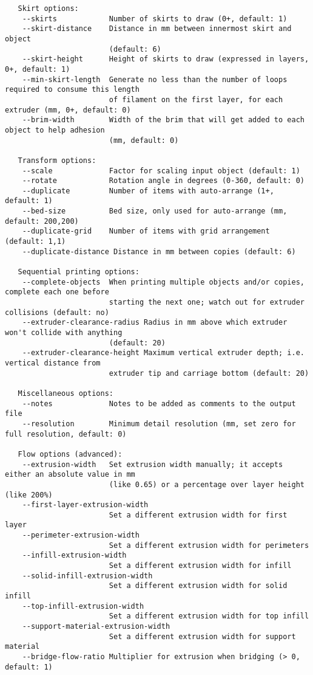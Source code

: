 \begin{verbatim}
   Skirt options:
    --skirts            Number of skirts to draw (0+, default: 1)
    --skirt-distance    Distance in mm between innermost skirt and object
                        (default: 6)
    --skirt-height      Height of skirts to draw (expressed in layers, 0+, default: 1)
    --min-skirt-length  Generate no less than the number of loops required to consume this length
                        of filament on the first layer, for each extruder (mm, 0+, default: 0)
    --brim-width        Width of the brim that will get added to each object to help adhesion
                        (mm, default: 0)

   Transform options:
    --scale             Factor for scaling input object (default: 1)
    --rotate            Rotation angle in degrees (0-360, default: 0)
    --duplicate         Number of items with auto-arrange (1+, default: 1)
    --bed-size          Bed size, only used for auto-arrange (mm, default: 200,200)
    --duplicate-grid    Number of items with grid arrangement (default: 1,1)
    --duplicate-distance Distance in mm between copies (default: 6)

   Sequential printing options:
    --complete-objects  When printing multiple objects and/or copies, complete each one before
                        starting the next one; watch out for extruder collisions (default: no)
    --extruder-clearance-radius Radius in mm above which extruder won't collide with anything
                        (default: 20)
    --extruder-clearance-height Maximum vertical extruder depth; i.e. vertical distance from
                        extruder tip and carriage bottom (default: 20)

   Miscellaneous options:
    --notes             Notes to be added as comments to the output file
    --resolution        Minimum detail resolution (mm, set zero for full resolution, default: 0)

   Flow options (advanced):
    --extrusion-width   Set extrusion width manually; it accepts either an absolute value in mm
                        (like 0.65) or a percentage over layer height (like 200%)
    --first-layer-extrusion-width
                        Set a different extrusion width for first layer
    --perimeter-extrusion-width
                        Set a different extrusion width for perimeters
    --infill-extrusion-width
                        Set a different extrusion width for infill
    --solid-infill-extrusion-width
                        Set a different extrusion width for solid infill
    --top-infill-extrusion-width
                        Set a different extrusion width for top infill
    --support-material-extrusion-width
                        Set a different extrusion width for support material
    --bridge-flow-ratio Multiplier for extrusion when bridging (> 0, default: 1)


\end{verbatim}
